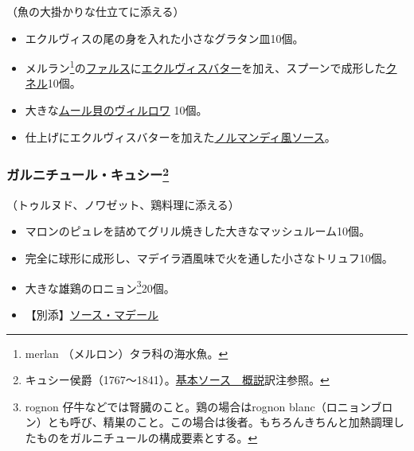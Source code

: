 \begin{recette}
（魚の大掛かりな仕立てに添える）

\begin{itemize}
\item
  エクルヴィスの尾の身を入れた小さなグラタン皿10個。
\item
  メルラン\footnote{merlan （メルロン）タラ科の海水魚。}の\protect\hyperlink{farce-a}{ファルス}に\protect\hyperlink{beurre-d-ecrevissse}{エクルヴィスバター}を加え、スプーンで成形した\protect\hyperlink{quenelles}{クネル}10個。
\item
  大きな\protect\hyperlink{moules-a-la-villeroy}{ムール貝のヴィルロワ}
  10個。
\item
  仕上げにエクルヴィスバターを加えた\protect\hyperlink{sauce-normande}{ノルマンディ風ソース}。
\end{itemize}

\atoaki{}

\hypertarget{garniture-cussy}{%
\subsubsection[ガルニチュール・キュシー]{\texorpdfstring{ガルニチュール・キュシー\footnote{キュシー侯爵（1767〜1841）。\protect\hyperlink{osbservation-sur-la-sauce}{基本ソース　概説}訳注参照。}}{ガルニチュール・キュシー}}\label{garniture-cussy}}



（トゥルヌド、ノワゼット、鶏料理に添える）

\begin{itemize}
\item
  マロンのピュレを詰めてグリル焼きした大きなマッシュルーム10個。
\item
  完全に球形に成形し、マデイラ酒風味で火を通した小さなトリュフ10個。
\item
  大きな雄鶏のロニョン\footnote{rognon
    仔牛などでは腎臓のこと。鶏の場合はrognon
    blanc（ロニョンブロン）とも呼び、精巣のこと。この場合は後者。もちろんきちんと加熱調理したものをガルニチュールの構成要素とする。}20個。
\item
  【別添】\protect\hyperlink{sauce-madere}{ソース・マデール}
\end{itemize}

\atoaki{}


\end{recette}
